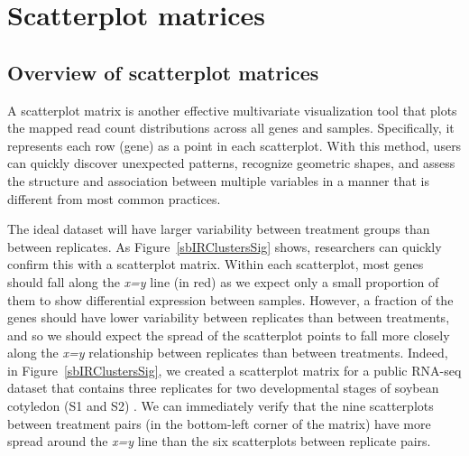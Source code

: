 \documentclass{bioinfo}
\begin{document}
\section{Scatterplot matrices}

\subsection{Overview of scatterplot matrices}

A scatterplot matrix is another effective multivariate visualization tool that plots the mapped read count distributions across all genes and samples. Specifically, it represents each row (gene) as a point in each scatterplot. With this method, users can quickly discover unexpected patterns, recognize geometric shapes, and assess the structure and association between multiple variables in a manner that is different from most common practices. 

The ideal dataset will have larger variability between treatment groups than between replicates. As Figure~\ref{sbIRClustersSig} shows, researchers can quickly confirm this with a scatterplot matrix. Within each scatterplot, most genes should fall along the \textit{x=y} line (in red) as we expect only a small proportion of them to show differential expression between samples. However, a fraction of the genes should have lower variability between replicates than between treatments, and so we should expect the spread of the scatterplot points to fall more closely along the \textit{x=y} relationship between replicates than between treatments. Indeed, in Figure~\ref{sbIRClustersSig}, we created a scatterplot matrix for a public RNA-seq dataset that contains three replicates for two developmental stages of soybean cotyledon (S1 and S2) \citep{Brown}. We can immediately verify that the nine scatterplots between treatment pairs (in the bottom-left corner of the matrix) have more spread around the \textit{x=y} line than the six scatterplots between replicate pairs.
\end{document}
